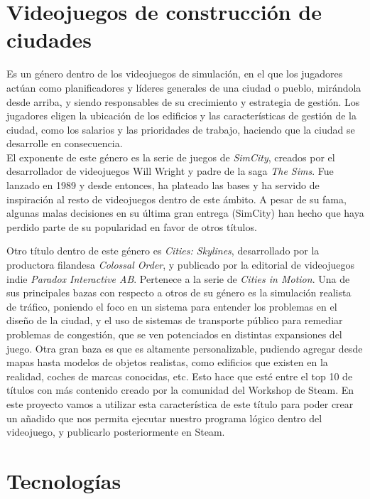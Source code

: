 \section{Videojuegos de construcción de ciudades}

Es un género dentro de los videojuegos de simulación, en el que los jugadores actúan como planificadores y líderes generales de una ciudad o pueblo, mirándola desde arriba, y siendo responsables de su crecimiento y estrategia de gestión. Los jugadores eligen la ubicación de los edificios y las características de gestión de la ciudad, como los salarios y las prioridades de trabajo, haciendo que la ciudad se desarrolle en consecuencia. \\

El exponente de este género es la serie de juegos de \textit{SimCity\texttrademark}, creados por el desarrollador de videojuegos Will Wright y padre de la saga \textit{The Sims\texttrademark}. Fue lanzado en 1989 y desde entonces, ha plateado las bases y ha servido de inspiración al resto de videojuegos dentro de este ámbito. A pesar de su fama, algunas malas decisiones en su última gran entrega (SimCity) han hecho que haya perdido parte de su popularidad en favor de otros títulos.

Otro título dentro de este género es \textit{Cities: Skylines\textcopyright}, desarrollado por la productora filandesa \textit{Colossal Order}, y publicado por la editorial de videojuegos indie \textit{Paradox Interactive AB}. Pertenece a la serie de \textit{Cities in Motion\textcopyright}. Una de sus principales bazas con respecto a otros de su género es la simulación realista de tráfico, poniendo el foco en un sistema para entender los problemas en el diseño de la ciudad, y el uso de sistemas de transporte público para remediar problemas de congestión, que se ven potenciados en distintas expansiones del juego. Otra gran baza es que es altamente personalizable, pudiendo agregar desde mapas hasta modelos de objetos realistas, como edificios que existen en la realidad, coches de marcas conocidas, etc. Esto hace que esté entre el top 10 de títulos con más contenido creado por la comunidad del Workshop de Steam. En este proyecto vamos a utilizar esta característica de este título para poder crear un añadido que nos permita ejecutar nuestro programa lógico dentro del videojuego, y publicarlo posteriormente en Steam.

\section{Tecnologías}

